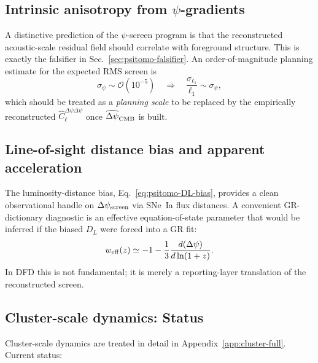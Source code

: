 \subsection{Intrinsic anisotropy from $\psi$-gradients}\label{sec:psi-anisotropy}

A distinctive prediction of the $\psi$-screen program is that the reconstructed acoustic-scale residual field should correlate with foreground structure. This is exactly the falsifier in Sec.~\ref{sec:psitomo-falsifier}. An order-of-magnitude planning estimate for the expected RMS screen is
\begin{equation}\label{eq:sigma-psi-estimate}
\sigma_\psi \sim \mathcal{O}(10^{-5})\quad\Rightarrow\quad \frac{\sigma_{\ell_1}}{\ell_1}\sim \sigma_\psi,
\end{equation}
which should be treated as a \emph{planning scale} to be replaced by the empirically reconstructed $\widehat C_\ell^{\Delta\psi\Delta\psi}$ once $\widehat{\Delta\psi}_{\rm CMB}$ is built.

\subsection{Line-of-sight distance bias and apparent acceleration}\label{sec:cosmo-distance}

The luminosity-distance bias, Eq.~\eqref{eq:psitomo-DL-bias}, provides a clean observational handle on $\Delta\psi_{\rm screen}$ via SNe~Ia flux distances. A convenient GR-dictionary diagnostic is an effective equation-of-state parameter that would be inferred if the biased $D_L$ were forced into a GR fit:
\begin{equation}\label{eq:weff}
w_{\rm eff}(z) \simeq -1 - \frac{1}{3}\frac{d(\Delta\psi)}{d\ln(1+z)}.
\end{equation}
In DFD this is not fundamental; it is merely a reporting-layer translation of the reconstructed screen.

\subsection{Cluster-scale dynamics: Status}\label{sec:cosmo-clusters}

Cluster-scale dynamics are treated in detail in Appendix~\ref{app:cluster-full}. Current status:

